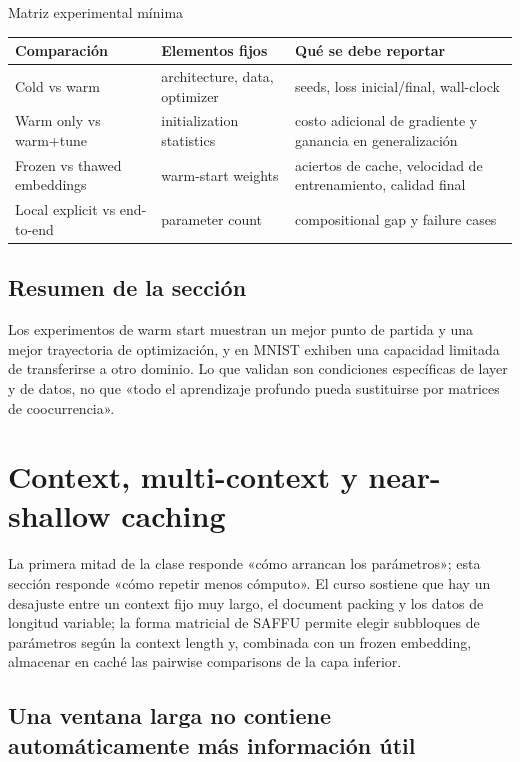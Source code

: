 \documentclass[a4paper]{article}
\begin{document}
\begin{knowledgebox}{Matriz experimental mínima}
\begin{tabularx}{\textwidth}{L{0.18\textwidth} L{0.24\textwidth} X}
\toprule
Comparación & Elementos fijos & Qué se debe reportar \\
\midrule
Cold vs warm & architecture, data, optimizer & seeds, loss inicial/final, wall-clock \\
Warm only vs warm+tune & initialization statistics & costo adicional de gradiente y ganancia en generalización \\
Frozen vs thawed embeddings & warm-start weights & aciertos de cache, velocidad de entrenamiento, calidad final \\
Local explicit vs end-to-end & parameter count & compositional gap y failure cases \\
\bottomrule
\end{tabularx}
\end{knowledgebox}

\subsection{Resumen de la sección}

Los experimentos de warm start muestran un mejor punto de partida y una mejor trayectoria de optimización, y en MNIST exhiben una capacidad limitada de transferirse a otro dominio. Lo que validan son condiciones específicas de layer y de datos, no que «todo el aprendizaje profundo pueda sustituirse por matrices de coocurrencia».
\section{Context, multi-context y near-shallow caching}

La primera mitad de la clase responde «cómo arrancan los parámetros»; esta sección responde «cómo repetir menos cómputo». El curso sostiene que hay un desajuste entre un context fijo muy largo, el document packing y los datos de longitud variable; la forma matricial de SAFFU permite elegir subbloques de parámetros según la context length y, combinada con un frozen embedding, almacenar en caché las pairwise comparisons de la capa inferior.

\subsection{Una ventana larga no contiene automáticamente más información útil}
\end{document}
